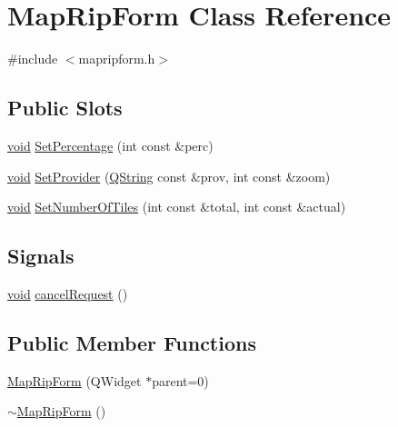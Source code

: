 \hypertarget{class_map_rip_form}{\section{\-Map\-Rip\-Form \-Class \-Reference}
\label{class_map_rip_form}
}


{\ttfamily \#include $<$mapripform.\-h$>$}

\subsection*{\-Public \-Slots}
\begin{DoxyCompactItemize}
\item 
\hyperlink{group___u_a_v_objects_plugin_ga444cf2ff3f0ecbe028adce838d373f5c}{void} \hyperlink{group___o_p_map_widget_gae4b3b2cf5a261ca12edc1e1f092f7790}{\-Set\-Percentage} (int const \&perc)
\item 
\hyperlink{group___u_a_v_objects_plugin_ga444cf2ff3f0ecbe028adce838d373f5c}{void} \hyperlink{group___o_p_map_widget_gabf71ea1f21a81271ca9487530d7c9b23}{\-Set\-Provider} (\hyperlink{group___u_a_v_objects_plugin_gab9d252f49c333c94a72f97ce3105a32d}{\-Q\-String} const \&prov, int const \&zoom)
\item 
\hyperlink{group___u_a_v_objects_plugin_ga444cf2ff3f0ecbe028adce838d373f5c}{void} \hyperlink{group___o_p_map_widget_ga7f74961ce862f3c6173a9634b3de2e53}{\-Set\-Number\-Of\-Tiles} (int const \&total, int const \&actual)
\end{DoxyCompactItemize}
\subsection*{\-Signals}
\begin{DoxyCompactItemize}
\item 
\hyperlink{group___u_a_v_objects_plugin_ga444cf2ff3f0ecbe028adce838d373f5c}{void} \hyperlink{group___o_p_map_widget_gada316d63680a0cc029958b0d0eb33f4a}{cancel\-Request} ()
\end{DoxyCompactItemize}
\subsection*{\-Public \-Member \-Functions}
\begin{DoxyCompactItemize}
\item 
\hyperlink{group___o_p_map_widget_ga992a9478361267f44a0935b7fb7c8476}{\-Map\-Rip\-Form} (\-Q\-Widget $\ast$parent=0)
\item 
\hyperlink{group___o_p_map_widget_gabc703f61b0a3e678f85ec3fa6b9c896a}{$\sim$\-Map\-Rip\-Form} ()
\end{DoxyCompactItemize}


